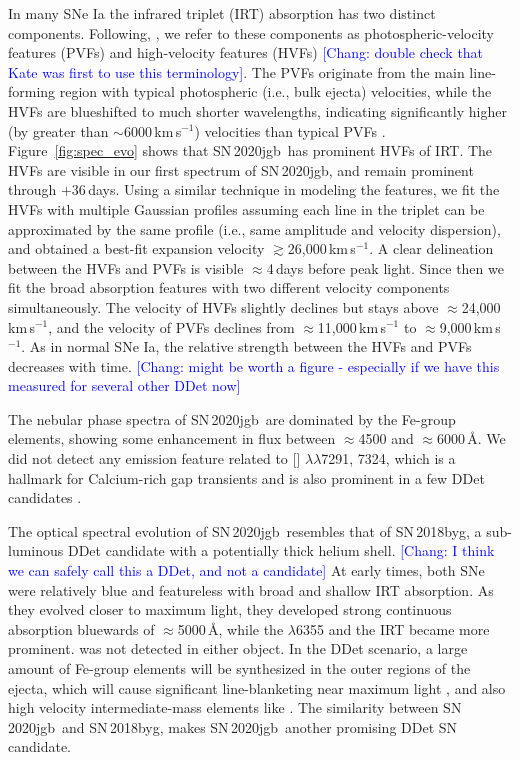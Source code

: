 \documentclass[twocolumn]{aastex631}
\newcommand{\sn}{SN\,2020jgb}
\newcommand{\chang}[1]{\textcolor{blue}{[Chang: #1]}}
\begin{document}
In many SNe Ia the  infrared triplet (IRT) absorption has two distinct components. Following, \citet{Maguire_2014}, we refer to these components as photospheric-velocity features (PVFs) and high-velocity features (HVFs) \chang{double check that Kate was first to use this terminology}. The PVFs originate from the main line-forming region with typical photospheric (i.e., bulk ejecta) velocities, while the HVFs are blueshifted to much shorter wavelengths, indicating significantly higher (by greater than $\sim$6000\,km\,s$^{-1}$) velocities than typical PVFs \citep{Silverman_HVF_2015}. Figure~\ref{fig:spec_evo} shows that \sn\ has prominent HVFs of  IRT. The HVFs are visible in our first spectrum of \sn, and remain prominent through $+36$\,days. Using a similar technique in modeling the  features, we fit the HVFs with multiple Gaussian profiles assuming each line in the triplet can be approximated by the same profile (i.e., same amplitude and velocity dispersion), and obtained a best-fit expansion velocity $\gtrsim$26,000\,km\,s$^{-1}$. A clear delineation between the HVFs and PVFs is visible $\approx$4\,days before peak light. Since then we fit the broad absorption features with two different velocity components simultaneously. The velocity of HVFs slightly declines but stays above $\approx$24,000\,km\,s$^{-1}$, and the velocity of PVFs declines from $\approx$11,000\,km\,s$^{-1}$ to $\approx$9,000\,km\,s$^{-1}$. As in normal SNe Ia, the relative strength between the HVFs and PVFs decreases with time. \chang{might be worth a figure - especially if we have this measured for several other DDet now}

The nebular phase spectra of \sn\ are dominated by the Fe-group elements, showing some enhancement in flux between $\approx$4500 and $\approx$6000\,\r{A}. We did not detect any emission feature related to [] $\lambda\lambda$7291, 7324, which is a hallmark for Calcium-rich gap transients and is also prominent in a few DDet candidates \citep[e.g., SN\,2016hnk and SN\,2019ofm;][]{De_Ca-rich_2020}. 

The optical spectral evolution of \sn\ resembles that of SN\,2018byg, a sub-luminous DDet candidate with a potentially thick helium shell. \chang{I think we can safely call this a DDet, and not a candidate} At early times, both SNe were relatively blue and featureless with broad and shallow  IRT absorption. As they evolved closer to maximum light, they developed strong continuous absorption bluewards of $\approx$5000\,\r{A}, while the  $\lambda$6355 and the  IRT became more prominent.  was not detected in either object. In the DDet scenario, a large amount of Fe-group elements will be synthesized in the outer regions of the ejecta, which will cause significant line-blanketing near maximum light \citep{Kromer_DD_2010, polin_observational_2019}, and also high velocity intermediate-mass elements like  \citep{Fink_DD_2010, Kromer_DD_2010}. The similarity between \sn\ and SN\,2018byg, makes \sn\ another promising DDet SN candidate. 
\end{document}
